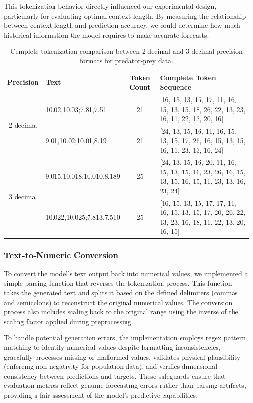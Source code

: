 \documentclass{article}
\begin{document}
This tokenization behavior directly influenced our experimental design, particularly for evaluating optimal context length. By measuring the relationship between context length and prediction accuracy, we could determine how much historical information the model requires to make accurate forecasts.

\begin{table}[H]
\centering
\begin{tabular}{cp{3cm}cp{6cm}}
\hline
\textbf{Precision} & \textbf{Text} & \textbf{Token Count} & \textbf{Complete Token Sequence} \\
\hline
\multirow{2}{*}{2 decimal} & 10.02,10.03;7.81,7.51 & 21 & [16, 15, 13, 15, 17, 11, 16, 15, 13, 15, 18, 26, 22, 13, 23, 16, 11, 22, 13, 20, 16] \\
\cline{2-4}
    & 9.01,10.02;10.01,8.19 & 21 & [24, 13, 15, 16, 11, 16, 15, 13, 15, 17, 26, 16, 15, 13, 15, 16, 11, 23, 13, 16, 24] \\
\hline
\multirow{2}{*}{3 decimal} & 9.015,10.018;10.010,8.189 & 25 & [24, 13, 15, 16, 20, 11, 16, 15, 13, 15, 16, 23, 26, 16, 15, 13, 15, 16, 15, 11, 23, 13, 16, 23, 24] \\
\cline{2-4}
    & 10.022,10.025;7.813,7.510 & 25 & [16, 15, 13, 15, 17, 17, 11, 16, 15, 13, 15, 17, 20, 26, 22, 13, 23, 16, 18, 11, 22, 13, 20, 16, 15] \\
\hline
\end{tabular}
\caption{Complete tokenization comparison between 2-decimal and 3-decimal precision formats for predator-prey data.}
\label{tab:precision_comparison}
\end{table}
\subsubsection*{Text-to-Numeric Conversion}

To convert the model's text output back into numerical values, we implemented a simple parsing function that reverses the tokenization process. This function takes the generated text and splits it based on the defined delimiters (commas and semicolons) to reconstruct the original numerical values. The conversion process also includes scaling back to the original range using the inverse of the scaling factor applied during preprocessing.

To handle potential generation errors, the implementation employs regex pattern matching to identify numerical values despite formatting inconsistencies, gracefully processes missing or malformed values, validates physical plausibility (enforcing non-negativity for population data), and verifies dimensional consistency between predictions and targets. These safeguards ensure that evaluation metrics reflect genuine forecasting errors rather than parsing artifacts, providing a fair assessment of the model's predictive capabilities.
\end{document}
